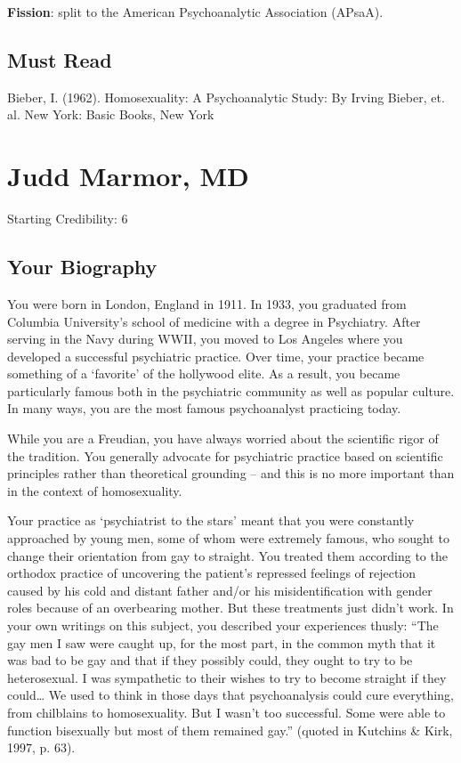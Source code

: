 \begin{refsection}
\textbf{Fission}: split to the American Psychoanalytic Association (APsaA).

\section{Must Read}
\label{mustread}

Bieber, I. (1962). Homosexuality: A Psychoanalytic Study: By Irving Bieber, et. al. New York: Basic Books, New York

\chapter{Judd Marmor, MD}
\label{juddmarmormd}

Starting Credibility: 6

\section{Your Biography}
\label{yourbiography}

You were born in London, England in 1911. In 1933, you graduated from Columbia University's school of medicine with a degree in Psychiatry. After serving in the Navy during WWII, you moved to Los Angeles where you developed a successful psychiatric practice. Over time, your practice became something of a `favorite' of the hollywood elite. As a result, you became particularly famous both in the psychiatric community as well as popular culture. In many ways, you are the most famous psychoanalyst practicing today.

While you are a Freudian, you have always worried about the scientific rigor of the tradition. You generally advocate for psychiatric practice based on scientific principles rather than theoretical grounding – and this is no more important than in the context of homosexuality.

Your practice as `psychiatrist to the stars' meant that you were constantly approached by young men, some of whom were extremely famous, who sought to change their orientation from gay to straight. You treated them according to the orthodox practice of uncovering the patient's repressed feelings of rejection caused by his cold and distant father and\slash or his misidentification with gender roles because of an overbearing mother. But these treatments just didn't work. In your own writings on this subject, you described your experiences thusly: “The gay men I saw were caught up, for the most part, in the common myth that it was bad to be gay and that if they possibly could, they ought to try to be heterosexual. I was sympathetic to their wishes to try to become straight if they could{\ldots} We used to think in those days that psychoanalysis could cure everything, from chilblains to homosexuality. But I wasn't too successful. Some were able to function bisexually but most of them remained gay.” (quoted in Kutchins \& Kirk, 1997, p. 63).


\end{refsection}
